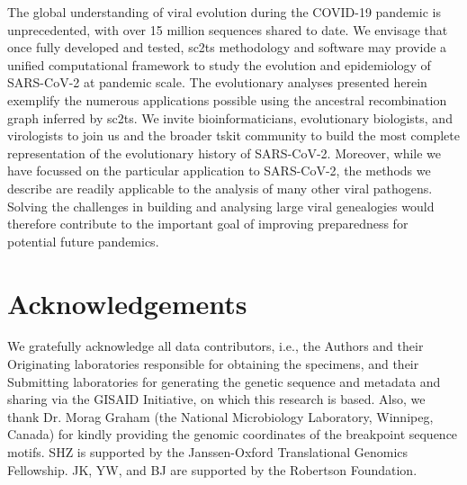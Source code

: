\documentclass{article}
\begin{document}
The global understanding of viral evolution during the COVID-19 pandemic is
unprecedented, with over 15 million sequences shared to date. We envisage that
once fully developed and tested, sc2ts methodology and software may provide a
unified computational framework to study the evolution and epidemiology of
SARS-CoV-2 at pandemic scale. The evolutionary analyses presented herein
exemplify the numerous applications possible using the ancestral recombination
graph inferred by sc2ts. We invite bioinformaticians, evolutionary biologists,
and virologists to join us and the broader tskit community to build the most
complete representation of the evolutionary history of SARS-CoV-2. Moreover,
while we have focussed on the particular application to SARS-CoV-2, the methods
we describe are readily applicable to the analysis of many other viral
pathogens. Solving the challenges in building and analysing large viral
genealogies would therefore contribute to the important goal of improving
preparedness for potential future pandemics.

\section{Acknowledgements}

We gratefully acknowledge all data contributors, i.e., the Authors and their
Originating laboratories responsible for obtaining the specimens, and their
Submitting laboratories for generating the genetic sequence and metadata and
sharing via the GISAID Initiative, on which this research is based. Also, we
thank Dr. Morag Graham (the National Microbiology Laboratory, Winnipeg, Canada)
for kindly providing the genomic coordinates of the breakpoint sequence motifs.
SHZ is supported by the Janssen-Oxford Translational Genomics Fellowship. JK,
YW, and BJ are supported by the Robertson Foundation.
\end{document}
